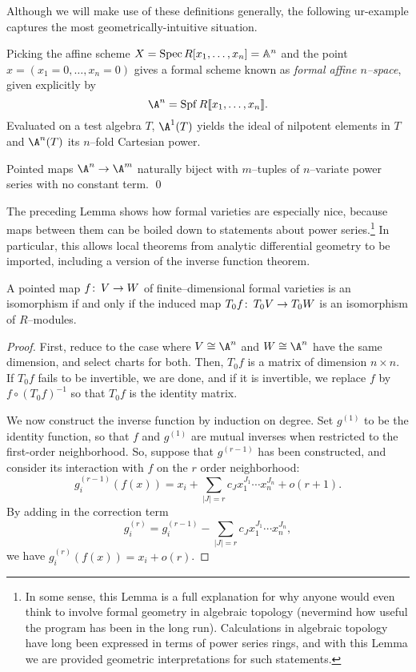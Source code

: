Although we will make use of these definitions generally, the following ur-example captures the most geometrically-intuitive situation.

\begin{example}
Picking the affine scheme $X = \operatorname{Spec} R[x_1, \ldots, x_n] = \mathbb A^n$ and the point $x = (x_1 = 0, \ldots, x_n = 0)$ gives a formal scheme known as \textit{formal affine $n$--space}, given explicitly by \[\A^n = \Spf R\llbracket x_1, \ldots, x_n\rrbracket.\]  Evaluated on a test algebra $T$, $\A^1(T)$ yields the ideal of nilpotent elements in $T$ and $\A^n(T)$ its $n$--fold Cartesian power.
\end{example}

\begin{lemma}\label{MapsOfFVarsArePowerSeries}
Pointed maps $\A^n \to \A^m$ naturally biject with $m$--tuples of $n$--variate power series with no constant term. \qed
\end{lemma}

The preceding Lemma shows how formal varieties are especially nice, because maps between them can be boiled down to statements about power series.\footnote{In some sense, this Lemma is a full explanation for why anyone would even think to involve formal geometry in algebraic topology (nevermind how useful the program has been in the long run).  Calculations in algebraic topology have long been expressed in terms of power series rings, and with this Lemma we are provided geometric interpretations for such statements.}  In particular, this allows local theorems from analytic differential geometry to be imported, including a version of the inverse function theorem.

\begin{theorem}\label{InverseFunctionTheoremForFVars}
A pointed map $f\colon\thinspace V \to W$ of finite--dimensional formal varieties is an isomorphism if and only if the induced map $T_0 f\colon\thinspace T_0 V \to T_0 W$ is an isomorphism of $R$--modules.
\end{theorem}
\begin{proof}
First, reduce to the case where $V \cong \A^n$ and $W \cong \A^n$ have the same dimension, and select charts for both.  Then, $T_0 f$ is a matrix of dimension $n \times n$.  If $T_0 f$ fails to be invertible, we are done, and if it is invertible, we replace $f$ by $f \circ (T_0 f)^{-1}$ so that $T_0 f$ is the identity matrix.

We now construct the inverse function by induction on degree.  Set $g^{(1)}$ to be the identity function, so that $f$ and $g^{(1)}$ are mutual inverses when restricted to the first-order neighborhood.  So, suppose that $g^{(r-1)}$ has been constructed, and consider its interaction with $f$ on the $r${\th} order neighborhood: \[g_i^{(r-1)}(f(x)) = x_i + \sum_{|J| = r} c_J x_1^{J_1} \cdots x_n^{J_n} + o(r+1). \]  By adding in the correction term \[g_i^{(r)} = g_i^{(r-1)} - \sum_{|J| = r} c_J x_1^{J_1} \cdots x_n^{J_n},\] we have $g_i^{(r)}(f(x)) = x_i + o(r)$.
\end{proof}

